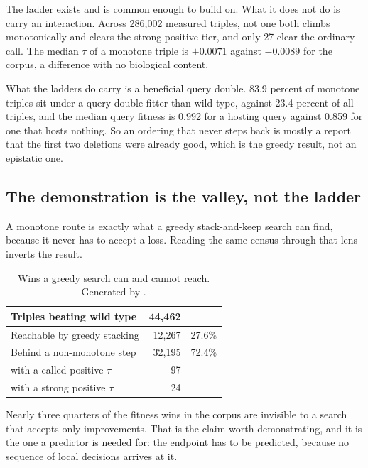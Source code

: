 The ladder exists and is common enough to build on. What it does not do is
carry an interaction. Across 286{,}002 measured triples, not one both climbs
monotonically and clears the strong positive tier, and only 27 clear the ordinary
call. The median $\tau$ of a monotone triple is $+0.0071$ against $-0.0089$ for
the corpus, a difference with no biological content.

What the ladders do carry is a beneficial query double. 83.9 percent of monotone
triples sit under a query double fitter than wild type, against 23.4 percent of
all triples, and the median query fitness is 0.992 for a hosting query against
0.859 for one that hosts nothing. So an ordering that never steps back is mostly
a report that the first two deletions were already good, which is the greedy
result, not an epistatic one.

\subsection{The demonstration is the valley, not the ladder}

A monotone route is exactly what a greedy stack-and-keep search can find, because
it never has to accept a loss. Reading the same census through that lens inverts
the result.

\begin{table}[H]
\centering
\footnotesize
\begin{tabular}{lrr}
\toprule
Triples beating wild type & 44{,}462 & \\
\midrule
Reachable by greedy stacking      & 12{,}267 & 27.6\% \\
Behind a non-monotone step        & 32{,}195 & 72.4\% \\
\quad with a called positive $\tau$ & 97     & \\
\quad with a strong positive $\tau$ & 24     & \\
\bottomrule
\end{tabular}
\caption{Wins a greedy search can and cannot reach. Generated by
\protect{}.}
\end{table}

Nearly three quarters of the fitness wins in the corpus are invisible to a search
that accepts only improvements. That is the claim worth demonstrating, and it is
the one a predictor is needed for: the endpoint has to be predicted, because no
sequence of local decisions arrives at it.

